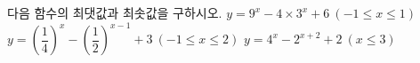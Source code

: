 다음 함수의 최댓값과 최솟값을 구하시오.
 $y=9^x-4\times 3^x+6\ (-1\le x\le 1)$
 $y=\left(\dfrac{1}{4}\right)^{x}-\left(\dfrac{1}{2}\right)^{x-1}+3\ (-1\le x\le 2)$
 $y=4^x-2^{x+2}+2\ (x\le 3)$
